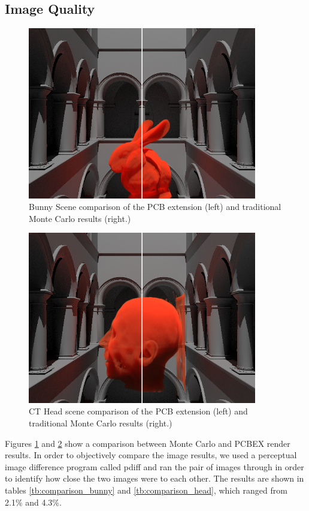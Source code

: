 \documentclass[12pt]{ucthesis}
\begin{document}
\subsection*{Image Quality}

\begin{figure}[h!]
    \centering
    \includegraphics[width=100mm]{img/compare.png}
    \caption{Bunny Scene comparison of the PCB extension (left) and traditional Monte Carlo results (right.)}
    \label{fig:compare1}
\end{figure}

\begin{figure}[h!]
    \centering
    \includegraphics[width=100mm]{img/compare_head.png}
    \caption{CT Head scene comparison of the PCB extension (left) and traditional Monte Carlo results (right.)}
    \label{fig:compare2}
\end{figure}

Figures \ref{fig:compare1} and \ref{fig:compare2} show a comparison between Monte Carlo and PCBEX render results.  In order to objectively compare the image results, we used a perceptual image difference program called pdiff and ran the pair of images through in order to identify how close the two images were to each other.  The results are shown in tables \ref{tb:comparison_bunny} and \ref{tb:comparison_head}, which ranged from 2.1\% and 4.3\%.
\end{document}
